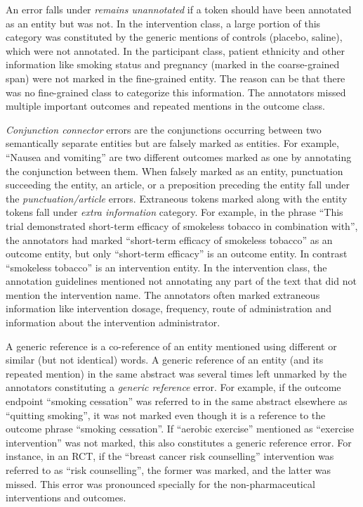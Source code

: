 \documentclass[10.7pt,]{article}
\begin{document}
An error falls under \textit{remains unannotated} if a token should have been annotated as an entity but was not.
In the intervention class, a large portion of this category was constituted by the generic mentions of controls (placebo, saline), which were not annotated.
In the participant class, patient ethnicity and other information like smoking status and pregnancy (marked in the coarse-grained span) were not marked in the fine-grained entity.
The reason can be that there was no fine-grained class to categorize this information. 
The annotators missed multiple important outcomes and repeated mentions in the outcome class.




\textit{Conjunction connector} errors are the conjunctions occurring between two semantically separate entities but are falsely marked as entities.
For example, ``Nausea and vomiting'' are two different outcomes marked as one by annotating the conjunction between them.
When falsely marked as an entity, punctuation succeeding the entity, an article, or a preposition preceding the entity fall under the \textit{punctuation/article} errors.
Extraneous tokens marked along with the entity tokens fall under \textit{extra information} category.
For example, in the phrase ``This trial demonstrated short-term efficacy of smokeless tobacco in combination with'', the annotators had marked ``short-term efficacy of smokeless tobacco'' as an outcome entity, but only ``short-term efficacy'' is an outcome entity.
In contrast ``smokeless tobacco'' is an intervention entity. 
In the intervention class, the annotation guidelines mentioned not annotating any part of the text that did not mention the intervention name.
The annotators often marked extraneous information like intervention dosage, frequency, route of administration and information about the intervention administrator.




A generic reference is a co-reference of an entity mentioned using different or similar (but not identical) words. 
A generic reference of an entity (and its repeated mention) in the same abstract was several times left unmarked by the annotators constituting a \textit{generic reference} error.
For example, if the outcome endpoint ``smoking cessation'' was referred to in the same abstract elsewhere as ``quitting smoking'', it was not marked even though it is a reference to the outcome phrase ``smoking cessation''.
If ``aerobic exercise'' mentioned as ``exercise intervention'' was not marked, this also constitutes a generic reference error.
For instance, in an RCT, if the ``breast cancer risk counselling'' intervention was referred to as ``risk counselling'', the former was marked, and the latter was missed.
This error was pronounced specially for the non-pharmaceutical interventions and outcomes.
\end{document}
